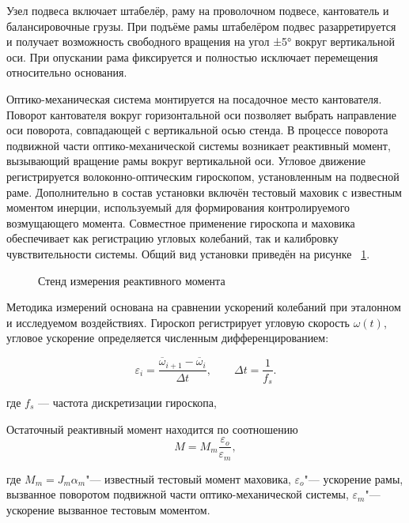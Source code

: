 Узел подвеса включает штабелёр, раму на проволочном подвесе, кантователь и балансировочные грузы. При подъёме рамы штабелёром подвес разарретируется и получает возможность свободного вращения на угол ±5° вокруг вертикальной оси. При опускании рама фиксируется и полностью исключает перемещения относительно основания.

Оптико-механическая система монтируется на посадочное место кантователя. Поворот кантователя вокруг горизонтальной оси позволяет выбрать направление оси поворота, совпадающей с вертикальной осью стенда. В процессе поворота подвижной части оптико-механической системы возникает реактивный момент, вызывающий вращение рамы вокруг вертикальной оси. Угловое движение регистрируется волоконно-оптическим гироскопом, установленным на подвесной раме. Дополнительно в состав установки включён тестовый маховик с известным моментом инерции, используемый для формирования контролируемого возмущающего момента. Совместное применение гироскопа и маховика обеспечивает как регистрацию угловых колебаний, так и калибровку чувствительности системы. Общий вид установки приведён на рисунке ~\cref{fig:yoiom}.

\begin{figure}[!h] 
	\caption{Стенд измерения реактивного момента}
	\label{fig:yoiom} 
\end{figure}

Методика измерений основана на сравнении ускорений колебаний при эталонном и исследуемом воздействиях. Гироскоп регистрирует угловую скорость $\omega(t)$, угловое ускорение определяется численным дифференцированием:

\begin{equation}
	\label{eq:mean_acc}
	\varepsilon_{i}
	= \frac{\overline{\omega}_{i+1}-\overline{\omega}_{i}}{\Delta t},
	\qquad
	\Delta t = \frac{1}{f_s}.
\end{equation}

где $f_s$ --- частота дискретизации гироскопа,

Остаточный реактивный момент находится по соотношению
\begin{equation}
	M = M_m\frac{\varepsilon_o}{\varepsilon_m},
\end{equation}

где \(M_m = J_m\alpha_m\)"--- известный тестовый момент маховика, \(\varepsilon_o\)"--- ускорение рамы, вызванное поворотом подвижной части оптико-механической системы, \(\varepsilon_m\)"--- ускорение вызванное тестовым моментом.

